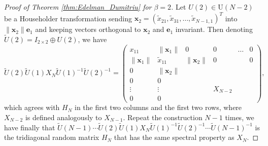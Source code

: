 \documentclass[11pt, a4paper]{article}
\numberwithin{equation}{section}
\newcommand{\Unitary}{\mathrm{U}}
\renewcommand{\vec}[1]{\mathbf{#1}}
\theoremstyle{definition}
\theoremstyle{remark}
\begin{document}
\begin{proof}[Proof of Theorem \ref{thm:Edelman_Dumitriu} for $\beta = 2$]
  Let $U(2) \in \Unitary(N - 2)$ be a Householder transformation sending $\vec{x}_2 = (\tilde{x}_{21}, \tilde{x}_{31}, \dotsc, \tilde{x}_{N - 1, 1})^T$ into $\lVert \vec{x}_2 \rVert \vec{e}_1$ and keeping vectors orthogonal to $\vec{x}_2$ and $\vec{e}_1$ invariant. Then denoting $\tilde{U}(2) = I_{2 \times 2} \oplus U(2)$, we have
    \begin{equation}
      \tilde{U}(2) \tilde{U}(1) X_N \tilde{U}(1)^{-1} \tilde{U}(2)^{-1} =
    \begin{pmatrix}
      x_{11} & \lVert \vec{x}_1 \rVert & 0 & 0 & \dots & 0 \\
      \lVert \vec{x}_1 \rVert & \tilde{x}_{11} & \lVert \vec{x}_2 \rVert & 0 & & 0 \\
      0 & \lVert \vec{x}_2 \rVert & & & & \\
      0 & 0 & & & & \\
      \vdots & \vdots & & X_{N - 2} & & \\
      0 & 0 & & & &
    \end{pmatrix},
  \end{equation}
  which agrees with $H_N$ in the first two columns and the first two rows, where $X_{N - 2}$ is defined analogously to $X_{N - 1}$. Repeat the construction $N - 1$ times, we have finally that $ \tilde{U}(N - 1) \dotsm \tilde{U}(2) \tilde{U}(1) X_N \tilde{U}(1)^{-1} \tilde{U}(2)^{-1} \dotsm \tilde{U}(N - 1)^{-1}$ is the tridiagonal random matrix $H_N$ that has the same spectral property as $X_N$.
\end{proof}
\end{document}
